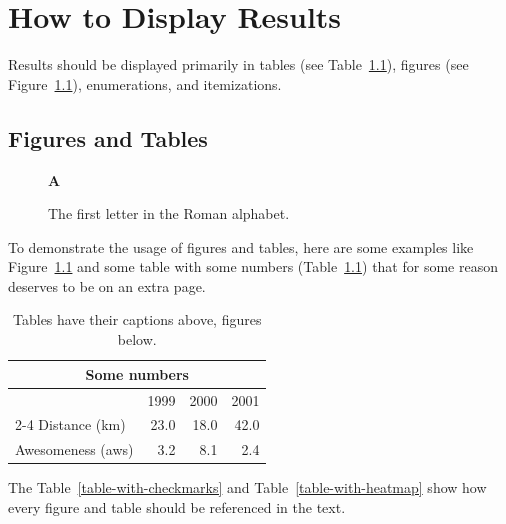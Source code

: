 \chapter{How to Display Results} \label{displaying-results}

Results should be displayed primarily in tables (see Table~\ref{table-with-numbers}), figures (see Figure~\ref{a-as-figure}), enumerations, and itemizations.

\section{Figures and Tables}

\begin{figure}[tb]%
  \begin{center}
    {\huge\bf A}
  \end{center}
  \caption{The first letter in the Roman alphabet.}
  \label{a-as-figure} %
\end{figure}

To demonstrate the usage of figures and tables, here are some examples like Figure~\ref{a-as-figure} %
and some table with some numbers (Table~\ref{table-with-numbers}) that for some reason deserves to be on an extra page.

\begin{table}[p]%
  \caption{Tables have their captions above, figures below.}
  \label{table-with-numbers}%
  \centering\small
  \begin{tabular}{@{}lrrr@{}} %
    \toprule
    \multicolumn{4}{c}{\bfseries Some numbers} \\
    \midrule
                      & 1999 & 2000 & 2001     \\
    \cmidrule(l){2-4} %
    Distance (km)     & 23.0 & 18.0 & 42.0     \\
    Awesomeness (aws) & 3.2  & 8.1  & 2.4      \\
    \bottomrule
  \end{tabular}
\end{table}
%
The Table~\ref{table-with-checkmarks} and Table~\ref{table-with-heatmap} show how every figure and table should be referenced in the text.

